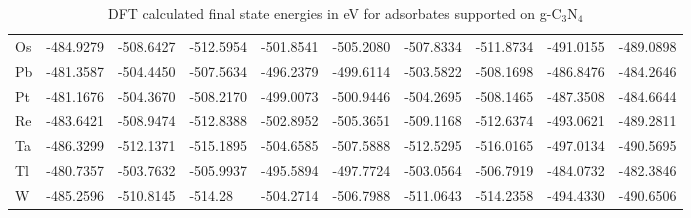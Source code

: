 \begin{table}[h]
{\begin{tabular}{*{10}{l}}
    Os & -484.9279 & -508.6427 & -512.5954 & -501.8541 & -505.2080 & -507.8334 & -511.8734 & -491.0155 & -489.0898 \\
    Pb & -481.3587 & -504.4450 & -507.5634 & -496.2379 & -499.6114 & -503.5822 & -508.1698 & -486.8476 & -484.2646 \\
    Pt & -481.1676 & -504.3670 & -508.2170 & -499.0073 & -500.9446 & -504.2695 & -508.1465 & -487.3508 & -484.6644 \\
    Re & -483.6421 & -508.9474 & -512.8388 & -502.8952 & -505.3651 & -509.1168 & -512.6374 & -493.0621 & -489.2811 \\
    Ta & -486.3299 & -512.1371 & -515.1895 & -504.6585 & -507.5888 & -512.5295 & -516.0165 & -497.0134 & -490.5695 \\
    Tl & -480.7357 & -503.7632 & -505.9937 & -495.5894 & -497.7724 & -503.0564 & -506.7919 & -484.0732 & -482.3846 \\
    W  & -485.2596 & -510.8145 & -514.28   & -504.2714 & -506.7988 & -511.0643 & -514.2358 & -494.4330 & -490.6506 \\
    \hline
  \end{tabular}
  }
  \caption{DFT calculated final state energies in eV for adsorbates supported on g-C$_3$N$_4$}
  \label{si_table4:e_g-c3n4}
\end{table}


